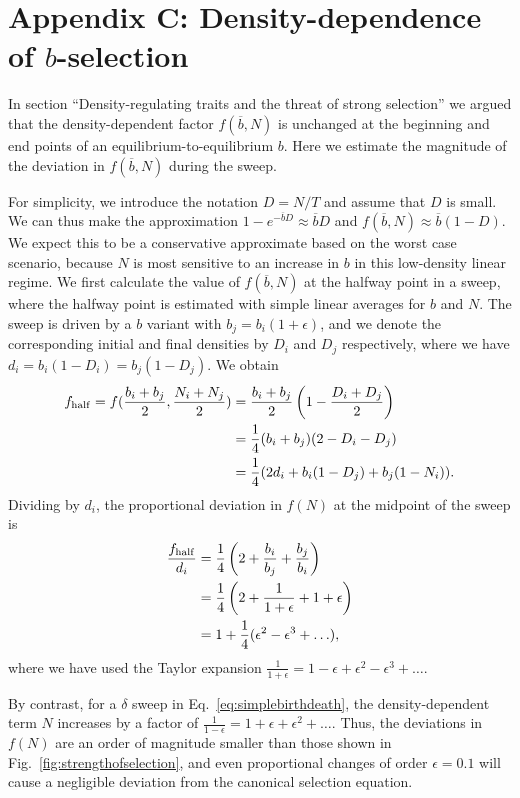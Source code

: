 \documentclass[12pt]{article}
\begin{document}
\section*{Appendix C: Density-dependence of $b$-selection}

In section ``Density-regulating traits and the threat of strong selection'' we argued that the density-dependent factor $f(\overline{b},N)$ is unchanged at the beginning and end points of an equilibrium-to-equilibrium $b$. Here we estimate the magnitude of the deviation in $f(\overline{b},N)$ during the sweep. 

For simplicity, we introduce the notation $D=N/T$ and assume that $D$ is small. We can thus make the approximation $1-e^{-\overline{b}D}\approx \overline{b}D$ and $f(\overline{b},N)\approx \overline{b}(1-D)$. We expect this to be a conservative approximate based on the worst case scenario, because $N$ is most sensitive to an increase in $b$ in this low-density linear regime. We first calculate the value of $f(\overline{b},N)$ at the halfway point in a sweep, where the halfway point is estimated with simple linear averages for $b$ and $N$. The sweep is driven by a $b$ variant with $b_j=b_i(1+\epsilon)$, and we denote the corresponding initial and final densities by $D_i$ and $D_j$ respectively, where we have $d_i=b_i(1-D_i)=b_j(1-D_j)$. We obtain
\begin{align}
f_{\rm{half}}=f(\frac{b_i+b_j}{2},\frac{N_i+N_j}{2})&=\frac{b_i+b_j}{2}\left(1-\frac{D_i+D_j}{2}\right) \nonumber \\
&=\frac{1}{4} (b_i+b_j)(2-D_i-D_j) \nonumber \\
&=\frac{1}{4} (2d_i+b_i(1-D_j)+b_j(1-N_i)).
\end{align}
Dividing by $d_i$, the proportional deviation in $f(N)$ at the midpoint of the sweep is
\begin{align}
\frac{f_{\rm{half}}}{d_i}&=\frac{1}{4}\left(2+\frac{b_i}{b_j}+\frac{b_j}{b_i}\right)\nonumber \\
&=\frac{1}{4}\left(2+\frac{1}{1+\epsilon}+1+\epsilon\right)\nonumber \\
&=1+\frac{1}{4}(\epsilon^2-\epsilon^3+\ldots),
\end{align}
where we have used the Taylor expansion $\frac{1}{1+\epsilon}=1-\epsilon+\epsilon^2-\epsilon^3+\ldots$. 

By contrast, for a $\delta$ sweep in Eq.~\eqref{eq:simplebirthdeath}, the density-dependent term $N$ increases by a factor of $\frac{1}{1-\epsilon}=1+\epsilon+\epsilon^2+\ldots$. Thus,  the deviations in $f(N)$ are an order of magnitude smaller than those shown in Fig.~\eqref{fig:strengthofselection}, and even proportional changes of order $\epsilon=0.1$ will cause a negligible deviation from the canonical selection equation.
\end{document}
